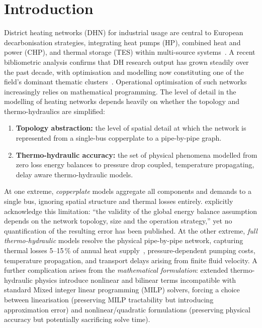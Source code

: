 \documentclass[a4paper,fleqn]{cas-dc}
\begin{document}
\section{Introduction}
\label{sec:introduction}


District heating networks (DHN) for industrial usage are central to European decarbonisation
strategies, integrating heat pumps (HP), combined heat and power (CHP), and thermal storage (TES) within
multi-source systems~\cite{Lund2014_4GDH,Werner2017,Lund2025_clean}. A recent bibliometric
analysis confirms that DH research output has grown steadily over
the past decade, with optimisation  and modelling now constituting
one of the field's dominant thematic clusters~\cite{PereaMoreno2026}.
Operational optimisation  of such networks increasingly relies on
mathematical programming. The level of detail in the modelling of heating networks depends heavily on whether the topology and thermo-hydraulics are simplified:

%
\begin{enumerate}[nosep]
  \item \textbf{Topology abstraction:} the level of spatial detail
        at which the network is represented from a single-bus
        copperplate to a pipe-by-pipe graph.
  \item \textbf{Thermo-hydraulic accuracy:} the set of physical phenomena
        modelled from zero loss energy balances to
        pressure drop coupled, temperature propagating, delay aware
        thermo-hydraulic models.
\end{enumerate}

At one extreme, \emph{copperplate} models aggregate all components
and demands to a single bus, ignoring spatial structure and thermal
losses entirely. \citet{Wirtz2020} explicitly acknowledge
this limitation: ``the validity of the global energy balance
assumption depends on the network topology, size and the operation
strategy,'' yet no quantification of the resulting error has been
published. At the other extreme, \emph{full thermo-hydraulic} models
resolve the physical pipe-by-pipe network, capturing thermal losses
 5--15\,\% of annual heat
supply~\cite{Frederiksen2013,Talebi2016}, pressure-dependent
pumping costs, temperature propagation, and transport delays arising
from finite fluid velocity. A further complication arises from the
\emph{mathematical formulation}: extended thermo-hydraulic physics
introduce nonlinear and bilinear terms incompatible with standard
Mixed integer linear programming (MILP) solvers, forcing a choice between linearisation (preserving
MILP tractability but introducing approximation error) and
nonlinear/quadratic formulations (preserving physical accuracy but
potentially sacrificing solve time).
\end{document}
